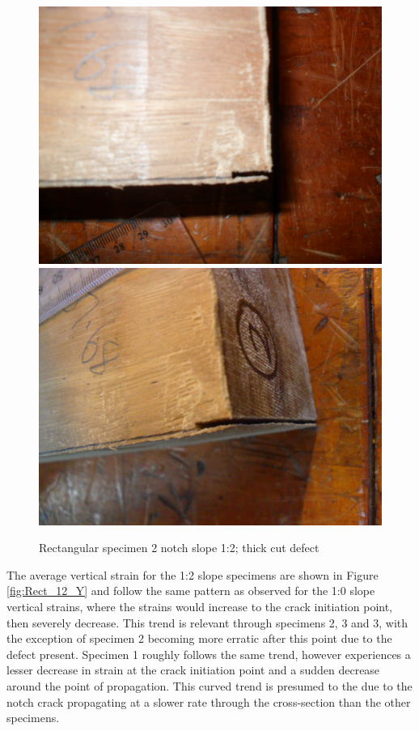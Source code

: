 \documentclass[11pt,a4paper]{article}
\numberwithin{equation}{subsection}
\begin{document}
\begin{figure}[h]
	\begin{center}
		\includegraphics[scale=0.065]{Cut_Top}
		\includegraphics[scale=0.065]{Cut_Side}
	\end{center}
	\caption{Rectangular specimen 2 notch slope 1:2; thick cut defect}
	\label{fig:Rect_Cut}
\end{figure}
\pagebreak

\noindent
The average vertical strain for the 1:2 slope specimens are shown in Figure \ref{fig:Rect_12_Y} and follow the same pattern as observed for the 1:0 slope vertical strains, where the strains would increase to the crack initiation point, then severely decrease. This trend is relevant through specimens 2, 3 and 3, with the exception of specimen 2 becoming more erratic after this point due to the defect present. Specimen 1 roughly follows the same trend, however experiences a lesser decrease in strain at the crack initiation point and a sudden decrease around the point of propagation. This curved trend is presumed to the due to the notch crack propagating at a slower rate through the cross-section than the other specimens. 
\vspace*{\baselineskip}
\end{document}
